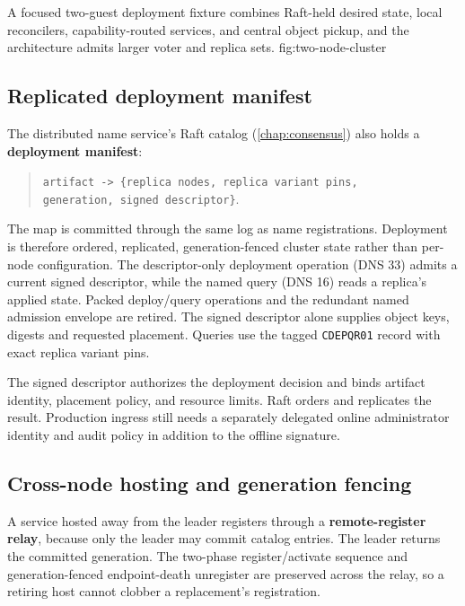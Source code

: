     {A focused two-guest deployment fixture combines Raft-held desired state,
    local reconcilers, capability-routed services, and central object pickup, and
    the architecture admits larger voter and replica sets.}
    {fig:two-node-cluster}

\subsection{Replicated deployment manifest}

The distributed name service's Raft catalog (\autoref{chap:consensus}) also holds a
\textbf{deployment manifest}:

\begin{quote}
\texttt{artifact -> \{replica nodes, replica variant pins,} \\
\texttt{generation, signed descriptor\}}.
\end{quote}

The map is committed through the same log as name registrations. Deployment
is therefore ordered, replicated, generation-fenced cluster state rather than
per-node configuration. The descriptor-only deployment operation (DNS 33) admits a
current signed descriptor, while the named query (DNS 16) reads a replica's applied
state. Packed deploy/query operations and the redundant named admission envelope are retired.
The signed descriptor alone supplies object keys, digests and requested placement.
Queries use the tagged \texttt{CDEPQR01} record with exact replica variant pins.

The signed descriptor authorizes the deployment decision and binds artifact
identity, placement policy, and resource limits. Raft orders and replicates the
result. Production ingress still needs a separately delegated online
administrator identity and audit policy in addition to the offline signature.

\subsection{Cross-node hosting and generation fencing}

A service hosted away from the leader registers through a
\textbf{remote-register relay}, because only the leader may commit catalog
entries. The leader returns the committed generation. The two-phase
register/activate sequence and generation-fenced endpoint-death unregister
are preserved across the relay, so a retiring host cannot clobber a
replacement's registration.

